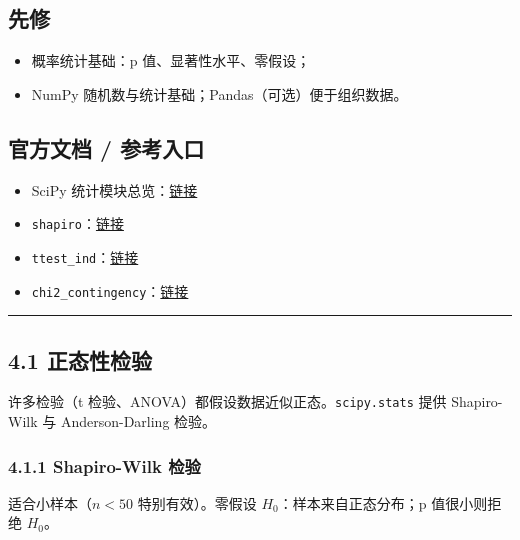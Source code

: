 \subsection{先修}\label{ux5148ux4fee-9}

\begin{itemize}
\tightlist
\item
  概率统计基础：p 值、显著性水平、零假设；
\item
  NumPy 随机数与统计基础；Pandas（可选）便于组织数据。
\end{itemize}

\subsection{官方文档 /
参考入口}\label{ux5b98ux65b9ux6587ux6863-ux53c2ux8003ux5165ux53e3-3}

\begin{itemize}
\tightlist
\item
  SciPy
  统计模块总览：\href{https://docs.scipy.org/doc/scipy/reference/stats.html}{链接}
\item
  \texttt{shapiro}：\href{https://docs.scipy.org/doc/scipy/reference/generated/scipy.stats.shapiro.html}{链接}
\item
  \texttt{ttest\_ind}：\href{https://docs.scipy.org/doc/scipy/reference/generated/scipy.stats.ttest_ind.html}{链接}
\item
  \texttt{chi2\_contingency}：\href{https://docs.scipy.org/doc/scipy/reference/generated/scipy.stats.chi2_contingency.html}{链接}
\end{itemize}

\begin{center}\rule{0.5\linewidth}{0.5pt}\end{center}

\subsection{4.1 正态性检验}\label{ux6b63ux6001ux6027ux68c0ux9a8c}

许多检验（t 检验、ANOVA）都假设数据近似正态。\texttt{scipy.stats} 提供
Shapiro-Wilk 与 Anderson-Darling 检验。

\subsubsection{4.1.1 Shapiro-Wilk 检验}\label{shapiro-wilk-ux68c0ux9a8c}

适合小样本（\(n<50\) 特别有效）。零假设 \(H_0\)：样本来自正态分布；p
值很小则拒绝 \(H_0\)。

